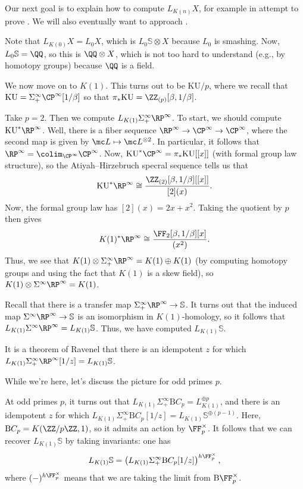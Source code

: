 \documentclass[../notes.tex]{subfiles}
\begin{document}
Our next goal is to explain how to compute $L_{K(n)}X$, for example in attempt to prove . We will also eventually want to approach .
\begin{example}
	Note that $L_{K(0)}X=L_0X$, which is $L_0\mathbb S\otimes X$ because $L_0$ is smashing. Now, $L_0\mathbb S=\QQ$, so this is $\QQ\otimes X$, which is not too hard to understand (e.g., by homotopy groups) because $\QQ$ is a field.
\end{example}
We now move on to $K(1)$. This turns out to be $\mathrm{KU}/p$, where we recall that $\mathrm{KU}=\Sigma_+^\infty\CP^\infty[1/\beta]$ so that $\pi_*\mathrm{KU}=\ZZ_{(p)}[\beta,1/\beta]$.
\begin{example}
	Take $p=2$. Then we compute $L_{K(1)}\Sigma^\infty_+\RP^\infty$. To start, we should compute $\mathrm{KU}^*\RP^\infty$. Well, there is a fiber sequence $\RP^\infty\to\CP^\infty\to\CP^\infty$, where the second map is given by $\mc L\mapsto\mc L^{\otimes2}$. In particular, it follows that $\RP^\infty=\colim_{\CP^\infty}\CP^\infty$. Now, $\mathrm{KU}^*\CP^\infty=\pi_*\mathrm{KU}[[x]]$ (with formal group law structure), so the Atiyah--Hirzebruch specral sequence tells us that
	\[\mathrm{KU}^*\RP^\infty\cong\frac{\ZZ_{(2)}[\beta,1/\beta][[x]]}{[2](x)}.\]
	Now, the formal group law has $[2](x)=2x+x^2$. Taking the quotient by $p$ then gives
	\[K(1)^*\RP^\infty\cong\frac{\FF_2[\beta,1/\beta][x]}{\left(x^2\right)}.\]
	Thus, we see that $K(1)\otimes\Sigma^\infty_+\RP^\infty=K(1)\oplus K(1)$ (by computing homotopy groups and using the fact that $K(1)$ is a skew field), so $K(1)\otimes\Sigma^\infty\RP^\infty=K(1)$.
\end{example}
\begin{remark}
	Recall that there is a transfer map $\Sigma_+^\infty\RP^\infty\to\mathbb S$. It turns out that the induced map $\Sigma^\infty\RP^\infty\to\mathbb S$ is an isomorphism in $K(1)$-homology, so it follows that $L_{K(1)}\Sigma^\infty\RP^\infty=L_{K(1)}\mathbb S$. Thus, we have computed $L_{K(1)}\mathbb S$.
\end{remark}
\begin{remark}
	It is a theorem of Ravenel that there is an idempotent $z$ for which $L_{K(1)}\Sigma_+^\infty\RP^\infty[1/z]=L_{K(1)}\mathbb S$.
\end{remark}
While we're here, let's discuss the picture for odd primes $p$.
\begin{example}
	At odd primes $p$, it turns out that $L_{K(1)}\Sigma_+^\infty\mathrm BC_p=L_{K(1)}^{\oplus p}$, and there is an idempotent $z$ for which $L_{K(1)}\Sigma_+^\infty\mathrm BC_p[1/z]=L_{K(1)}\mathbb S^{\oplus(p-1)}$. Here, $\mathrm BC_p=K(\ZZ/p\ZZ,1)$, so it admits an action by $\FF_p^\times$. It follows that we can recover $L_{K(1)}\mathbb S$ by taking invariants: one has
	\[L_{K(1)}\mathbb S=\left(L_{K(1)}\Sigma_+^\infty\mathrm BC_p[1/z]\right)^{h\FF_p^\times},\]
	where $(-)^{h\FF_p^\times}$ means that we are taking the limit from $\mathrm B\FF_p^\times$.
\end{example}
\end{document}

